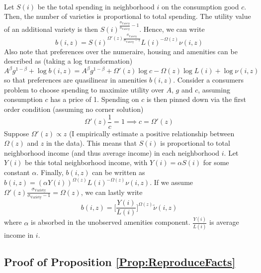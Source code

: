 \documentclass[12pt]{article}
\begin{document}
	\paragraph*{}
	Let $S(i)$ be the total spending in neighborhood $i$ on the consumption good $c$. Then, the number of varieties is proportional to total spending. The utility value of an additional variety is then $S(i)^{\frac{\sigma_{\text{Variety}}}{\sigma_{\text{Variety}}} - 1}$. Hence, we can write 
	$$b(i, z) = S(i)^{\Omega'(z)\frac{\sigma_{\text{Variety}}}{\sigma_{\text{Variety}}-1}}L(i)^{-\Omega(z)}\nu(i,z)$$ Also note that preferences over the numeraire, housing and amenities can be described as (taking a log transformation) $$A^{\beta}g^{1-\beta} + \log b(i, z) = A^{\beta}g^{1-\beta} +  \Omega'(z)\log c - \Omega(z)\log L(i) + \log \nu(i, z) $$ so that preferences are quasilinear in amenities $b(i, z)$. Consider a consumers problem to choose spending to maximize utility over $A$, $g$ and $c$, assuming consumption $c$ has a price of 1. Spending on $c$ is then pinned down via the first order condition (assuming no corner solution) $$\Omega'(z)\frac{1}{c} = 1 \implies c = \Omega'(z)$$ Suppose $\Omega'(z) \propto z$ (I empirically estimate a positive relationship between $\Omega(z)$ and $z$ in the data). This means that $S(i)$ is proportional to total neighborhood income (and thus average income) in each neighborhood $i$. Let $Y(i)$ be this total neighborhood income, with $Y(i) = \alpha S(i)$ for some constant $\alpha$. Finally, $b(i, z)$ can be written as $b(i, z) = (\alpha Y(i))^{\Omega(z)}L(i)^{-\Omega(z)}\nu(i, z)$. If we assume $\Omega'(z)\frac{\sigma_{\text{Variety}}}{\sigma_{\text{Variety}} - 1} = \Omega(z)$, we can lastly write
	$$b(i, z) =  \big[\frac{Y(i)}{L(i)}\big]^{\Omega(z)}\tilde{\nu}(i, z)$$ where $\alpha$ is absorbed in the unobserved amenities component. $\frac{Y(i)}{L(i)}$ is average income in $i$.
	
	\clearpage
	\subsection{Proof of Proposition \ref{Prop:ReproduceFacts}}\label{Proof:ReproduceFacts}
\end{document}
